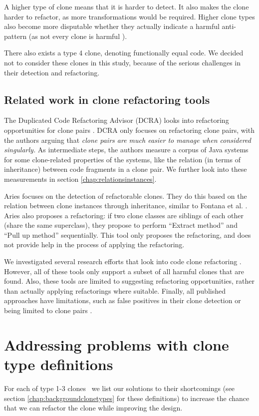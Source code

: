 \documentclass[a4paper]{article}
\begin{document}
A higher type of clone means that it is harder to detect. It also makes the clone harder to refactor, as more transformations would be required. Higher clone types also become more disputable whether they actually indicate a harmful anti-pattern (as not every clone is harmful \cite{jarzabek2010clones, kapser2008cloning}).

There also exists a type 4 clone, denoting functionally equal code. We decided not to consider these clones in this study, because of the serious challenges in their detection and refactoring.

\subsection{Related work in clone refactoring tools}
The Duplicated Code Refactoring Advisor (DCRA) looks into refactoring opportunities for clone pairs \cite{fontana2012duplicated, fontana2015duplicated}. DCRA only focuses on refactoring clone pairs, with the authors arguing that \textit{clone pairs are much easier to manage when considered singularly.} As intermediate steps, the authors measure a corpus of Java systems for some clone-related properties of the systems, like the relation (in terms of inheritance) between code fragments in a clone pair. We further look into these measurements in section \ref{chap:relationsinstances}.

Aries \cite{higo2004aries, higo2008metric} focuses on the detection of refactorable clones. They do this based on the relation between clone instances through inheritance, similar to Fontana et al. \cite{fontana2012duplicated}. Aries also proposes a refactoring: if two clone classes are siblings of each other (share the same superclass), they propose to perform ``Extract method'' and ``Pull up method'' sequentially. This tool only proposes the refactoring, and does not provide help in the process of applying the refactoring.

We investigated several research efforts that look into code clone refactoring \cite{alwaqfi2017refactoring, chen2018clone, koni2001scenario}. However, all of these tools only support a subset of all harmful clones that are found. Also, these tools are limited to suggesting refactoring opportunities, rather than actually applying refactorings where suitable. Finally, all published approaches have limitations, such as false positives in their clone detection \cite{chen2018clone} or being limited to clone pairs \cite{higo2008metric}.

\section{Addressing problems with clone type definitions}\label{chap:clonetypes}
For each of type 1-3 clones~\cite{roy2007survey} we list our solutions to their shortcomings (see section \ref{chap:backgroundclonetypes} for these definitions) to increase the chance that we can refactor the clone while improving the design.
\end{document}
